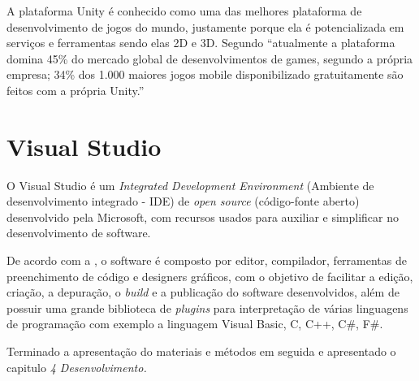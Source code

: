 A plataforma Unity é conhecido como uma das melhores plataforma de desenvolvimento de jogos do mundo, justamente porque ela é potencializada em serviços e ferramentas sendo elas 2D e 3D.
Segundo  \enquote{atualmente a plataforma domina 45\% do mercado global de desenvolvimentos de games, segundo a própria empresa; 34\% dos 1.000 maiores jogos mobile disponibilizado gratuitamente são feitos com a própria Unity.}

\section{Visual Studio}

O Visual Studio é um  \textit{Integrated Development Environment} (Ambiente de desenvolvimento integrado - IDE) de \textit{open source} (código-fonte aberto) desenvolvido pela Microsoft, com recursos usados para auxiliar e simplificar no desenvolvimento de software.

De acordo com a , o software é composto por editor, compilador, ferramentas de preenchimento de código e designers gráficos, com o objetivo de facilitar a edição, criação, a depuração, o \textit{build} e a publicação do software desenvolvidos, além de possuir uma grande biblioteca de \textit{plugins} para interpretação de várias linguagens de programação com exemplo a linguagem Visual Basic, C, C++, C\#, F\#.

Terminado a apresentação do materiais e métodos em seguida e apresentado o capitulo \textit{4 Desenvolvimento.}
